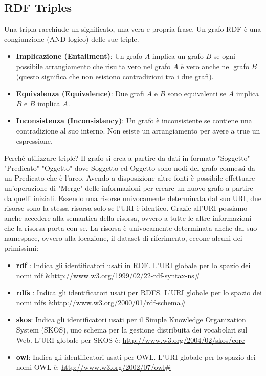 \subsection{RDF Triples}
Una tripla racchiude un significato, una vera e propria frase. Un grafo RDF è una congiunzione (AND logico) delle sue triple. 
\begin{itemize}
	\item \textbf{Implicazione (Entailment)}: Un grafo $A$ implica un grafo $B$ se ogni possibile arrangiamento che risulta vero nel grafo $A$ è vero anche nel grafo $B$ (questo significa che non esistono contradizioni tra i due grafi). 
	\item \textbf{Equivalenza (Equivalence)}: Due grafi $A$ e $B$ sono equivalenti se $A$ implica $B$ e $B$ implica $A$.
	\item \textbf{Inconsistenza (Inconsistency)}: Un grafo è inconsistente se contiene una contradizione al suo interno. Non esiste un arrangiamento per avere a true un espressione.
\end{itemize}
Perché utilizzare triple?
\noindent Il grafo si crea a partire da dati in formato "Soggetto"-"Predicato"-"Oggetto" dove Soggetto ed Oggetto sono nodi del grafo connessi da un Predicato che è l'arco.\newline
Avendo a disposizione altre fonti è possibile effettuare un'operazione di "Merge" delle informazioni per creare un nuovo grafo
a partire da quelli iniziali. Essendo una risorse univocamente determinata dal suo URI, due risorse sono la stessa risorsa solo se l'URI è identico. Grazie all'URI possiamo anche accedere alla semantica della risorsa, ovvero a tutte le altre informazioni che la risorsa porta con se.\newline
La risorsa è univocamente determinata anche dal suo namespace, ovvero alla locazione, il dataset di riferimento, eccone alcuni dei primissimi:
\begin{itemize}
	\item \textbf{rdf} : Indica gli identificatori usati in RDF. L'URI globale per lo spazio dei nomi rdf è:\newline \url{http://www.w3.org/1999/02/22-rdf-syntax-ns#} 
	\item \textbf{rdfs} : Indica gli identificatori usati per RDFS. L'URI globale per lo spazio dei nomi rdfs è:\newline \url{http://www.w3.org/2000/01/rdf-schema#} 
	\item \textbf{skos}: Indica gli identificatori usati per il Simple Knowledge Organization System (SKOS), uno schema per la gestione distribuita dei vocabolari sul Web. L'URI globale per SKOS è:\newline
	\url{http://www.w3.org/2004/02/skos/core}
	\item \textbf{owl}: Indica gli identificatori usati per OWL. L'URI globale per lo spazio dei nomi OWL è:\newline
	\url{http://www.w3.org/2002/07/owl#}
\end{itemize}

